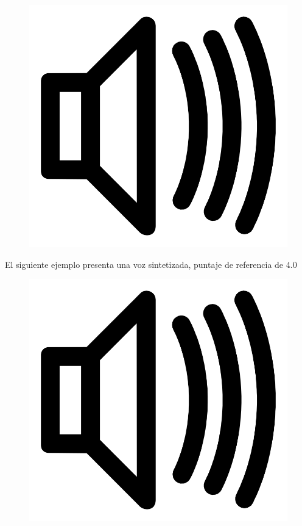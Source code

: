 \begin{figure}[H]
    \centering
    \includegraphics[scale=0.02]{imagenes/ale.jpg}
\end{figure}

El siguiente ejemplo presenta una voz sintetizada, puntaje de referencia de 4.0

\begin{figure}[H]
    \centering
    \includegraphics[scale=0.02]{imagenes/ale.jpg}
\end{figure}

